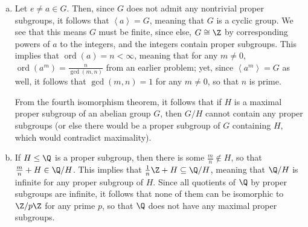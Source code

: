\documentclass[10pt]{mypackage}
\begin{document}
\begin{solution}\hfill
  \begin{enumerate}[(a)]
    \item Let $ e\neq a\in G $. Then, since $G$ does not admit any nontrivial proper subgroups, it follows that $ \left\langle a \right\rangle = G $, meaning that $G$ is a cyclic group. We see that this means $G$ must be finite, since else, $G\cong \Z$ by corresponding powers of $ a $ to the integers, and the integers contain proper subgroups. This implies that $ \operatorname{ord}\left( a \right) = n < \infty $, meaning that for any $m\neq 0$, $ \operatorname{ord}\left( a^{m} \right) = \frac{n}{\operatorname{gcd}\left( m,n \right)} $ from an earlier problem; yet, since $ \left\langle a^{m} \right\rangle = G$ as well, it follows that $\operatorname{gcd}\left( m,n \right) = 1$ for any $m\neq 0$, so that $n$ is prime.\newline

      From the fourth isomorphism theorem, it follows that if $H$ is a maximal proper subgroup of an abelian group $G$, then $G/H$ cannot contain any proper subgroups (or else there would be a proper subgroup of $G$ containing $H$, which would contradict maximality).
    \item If $H\leq \Q$ is a proper subgroup, then there is some $ \frac{m}{n}\notin H $, so that $ \frac{m}{n} + H\in \Q/H $. This implies that $ \frac{1}{n}\Z + H\subseteq \Q/H $, meaning that $ \Q/H $ is infinite for any proper subgroup of $H$. Since all quotients of $\Q$ by proper subgroups are infinite, it follows that none of them can be isomorphic to $\Z/p\Z$ for any prime $p$, so that $\Q$ does not have any maximal proper subgroups.
  \end{enumerate}
\end{solution}
\end{document}
